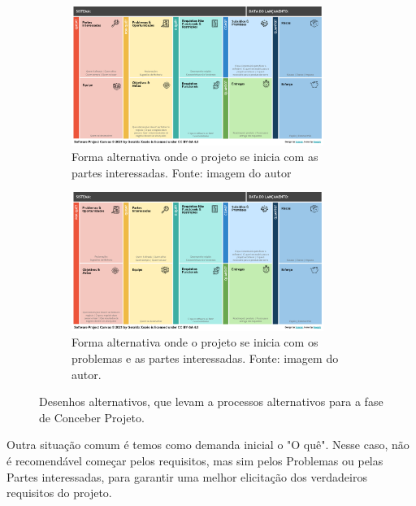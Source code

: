 \documentclass[fontsize=12pt, a4paper,pagesize=auto,toc=listof, ,twoside,chapterprefix=false,appendixprefix=true,open=right]{scrbook}
\begin{document}
\begin{figure}
    \centering
    \begin{subfigure}[b]{\textwidth}
    \centering
    \includegraphics[width=0.9\textwidth]{imagens/alternativa2.png}
    \caption{Forma alternativa onde o projeto se inicia com as partes interessadas. Fonte: imagem do autor}
    \label{fig:alter2}
    \end{subfigure}

    \vspace{1cm}

    \begin{subfigure}[b]{\textwidth}
    \centering
    \includegraphics[width=0.9\textwidth]{imagens/alternativa3.png}
    \caption{Forma alternativa onde o projeto se inicia com os problemas e as partes interessadas. Fonte: imagem do autor.}
    \label{fig:alter3}
    \end{subfigure}
    \caption{Desenhos alternativos, que levam a processos alternativos para a fase de Conceber Projeto.}
    \label{fig:alternativas}
\end{figure}

Outra situação comum é temos como demanda inicial o "O quê". Nesse caso, não é recomendável começar pelos requisitos, mas sim pelos Problemas ou pelas Partes interessadas, para garantir uma melhor elicitação dos verdadeiros requisitos do projeto.
\end{document}
